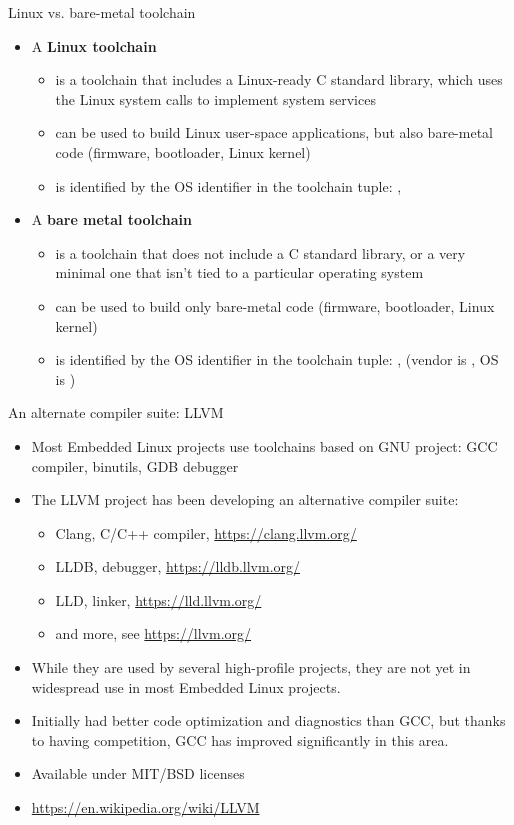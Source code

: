 \begin{frame}{Linux vs. bare-metal toolchain}
  \begin{itemize}
  \item A {\bf Linux toolchain}
    \begin{itemize}
    \item is a toolchain that includes a Linux-ready C standard library, which
          uses the Linux system calls to implement system services
    \item can be used to build Linux user-space applications, but also
          bare-metal code (firmware, bootloader, Linux kernel)
    \item is identified by the  OS identifier in the
          toolchain tuple: , 
    \end{itemize}
  \item A {\bf bare metal toolchain}
    \begin{itemize}
    \item is a toolchain that does not include a C standard library, or a very
          minimal one that isn't tied to a particular operating system
    \item can be used to build only bare-metal code (firmware,
          bootloader, Linux kernel)
    \item is identified by the  OS identifier in the
          toolchain tuple: , 
          (vendor is , OS is )
    \end{itemize}
  \end{itemize}
\end{frame}

\begin{frame}{An alternate compiler suite: LLVM}
  \begin{itemize}
  \item Most Embedded Linux projects use toolchains based on GNU
        project: GCC compiler, binutils, GDB debugger
  \item The LLVM project has been developing an alternative compiler suite:
    \begin{itemize}
    \item Clang, C/C++ compiler, \url{https://clang.llvm.org/}
    \item LLDB, debugger, \url{https://lldb.llvm.org/}
    \item LLD, linker, \url{https://lld.llvm.org/}
    \item and more, see \url{https://llvm.org/}
    \end{itemize}
  \item While they are used by several high-profile projects, they are
        not yet in widespread use in most Embedded Linux projects.
  \item Initially had better code optimization and diagnostics than
        GCC, but thanks to having competition, GCC has improved
        significantly in this area.
  \item Available under MIT/BSD licenses
  \item \url{https://en.wikipedia.org/wiki/LLVM}
  \end{itemize}
\end{frame}
